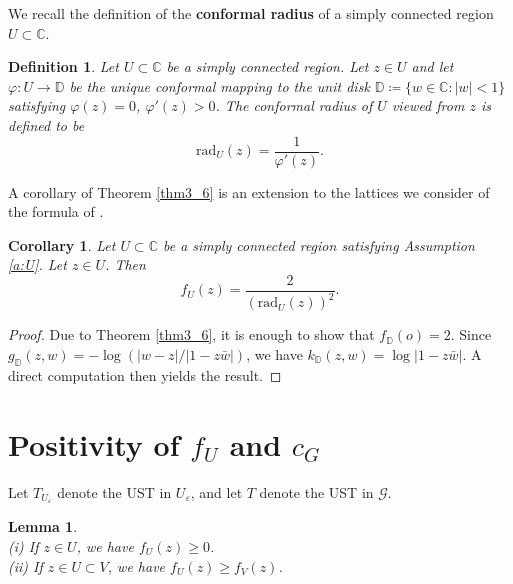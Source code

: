 \documentclass[11pt]{article}
\newtheorem{lemma}[theorem]{Lemma}
\newtheorem{corollary}[theorem]{Corollary}
\newtheorem{definition}{Definition}[section]
\theoremstyle{remark}
\def\eps{\varepsilon}
\def\cG{\mathcal{G}}
\begin{document}
We recall the definition of the \textbf{conformal radius} of a simply connected region \(U\subset\mathbb{C}\).
\begin{definition}\label{def3_1}
    Let \(U\subset\mathbb{C}\) be a simply connected region. Let \(z\in U\) and let \(\varphi : U \rightarrow \mathbb{D}\) be the unique conformal mapping to the unit disk \(\mathbb{D}\coloneqq \{w \in \mathbb{C} : |w| < 1\}\) satisfying \(\varphi(z) = 0\), \(\varphi'(z) > 0\). The conformal radius of \(U\) viewed from \(z\) is defined to be 
    \[
        \mathrm{rad}_U(z) = \frac{1}{\varphi'(z)}.
    \]
\end{definition}

A corollary of Theorem \ref{thm3_6} is an extension to the lattices we consider of the 
formula of \cite[Example 4.10]{A-CR25}.

\begin{corollary}\label{cor3_7}
    Let \(U\subset\mathbb{C}\) be a simply connected region satisfying Assumption \ref{a:U}. Let \(z\in U\).  
Then 
    \[  f_U(z)
        = \frac{2}{(\mathrm{rad}_U(z))^2}.   \]
\end{corollary}

\begin{proof}
Due to Theorem \ref{thm3_6}, it is enough to show that $f_{\mathbb{D}}(o) = 2$.
Since $g_{\mathbb{D}}(z,w) = - \log ( |w - z| / |1 - z \bar{w}| )$, we have
$k_{\mathbb{D}}(z,w) = \log | 1 - z \bar{w} |$. A direct computation then yields
the result.
\end{proof}


\section{Positivity of $f_U$ and $c_G$}
\label{sec:positive}

Let $T_{U_\eps}$ denote the UST in $U_\eps$, and let $T$ denote the UST in $\cG$. 

\begin{lemma}
\label{lem:monotone} \ \\
(i) If $z \in U$, we have $f_U(z) \ge 0$. \\
(ii) If $z \in U \subset V$, we have $f_U(z) \ge f_V(z)$.
\end{lemma}
\end{document}

